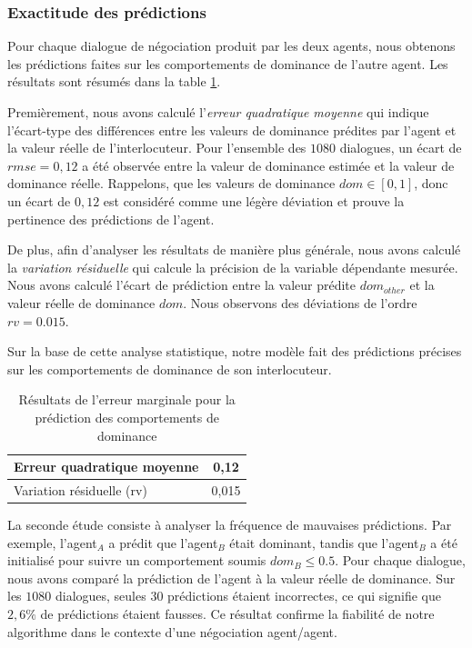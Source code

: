	\subsubsection{Exactitude des prédictions}
	
	Pour chaque dialogue de négociation produit par les deux agents, nous obtenons les prédictions faites sur les comportements de dominance de l'autre agent. Les résultats sont résumés dans la table \ref{tab:res1}. 

	Premièrement, nous avons calculé l'\emph {erreur quadratique moyenne} qui indique l'écart-type des différences entre les valeurs de dominance prédites par l'agent et la valeur réelle de l'interlocuteur.
	Pour l'ensemble des $1080$ dialogues, un écart de $rmse = 0,12$ a été observée entre la valeur de dominance estimée et la valeur de dominance réelle. Rappelons, que les valeurs de dominance $dom \in [0,1]$, donc un écart de $0,12$ est considéré comme une légère déviation et prouve la pertinence des prédictions de l'agent. 
	
	 De plus, afin d'analyser les résultats de manière plus générale, nous avons calculé la \emph {variation résiduelle} qui calcule la précision de la variable dépendante mesurée. Nous avons calculé l'écart de prédiction entre la valeur prédite $ dom_{other} $ et la valeur réelle de dominance $dom$.
	Nous observons des déviations de l'ordre $ rv = 0.015 $.
	
	 Sur la base de cette analyse statistique, notre modèle fait des prédictions précises sur les comportements de dominance de son interlocuteur.
	
	
	\begin{table}[h]
		\centering
		\caption{Résultats de l'erreur marginale pour la prédiction des comportements de dominance} 
		\begin{tabular}{|l|c|}
			\hline
			Erreur quadratique moyenne & 0,12 \\
			\hline
			Variation résiduelle (rv) & 0,015 \\
			\hline
		\end{tabular}
		
		\label{tab:res1}
	\end{table}
	
	La seconde étude consiste à analyser la fréquence de mauvaises prédictions. 
	Par exemple, l'agent$_A$ a prédit que l'agent$_B$ était dominant, tandis que l'agent$_B$ a été initialisé pour suivre un comportement soumis $dom_B \leq 0.5$.  Pour chaque dialogue, nous avons comparé la prédiction de l'agent à la valeur réelle de dominance. Sur les $1080$ dialogues, seules $ 30 $ prédictions étaient incorrectes, ce qui signifie que $ 2,6 \% $ de prédictions étaient fausses. 
	Ce résultat confirme la fiabilité de notre algorithme dans le contexte d'une négociation agent/agent.
	
